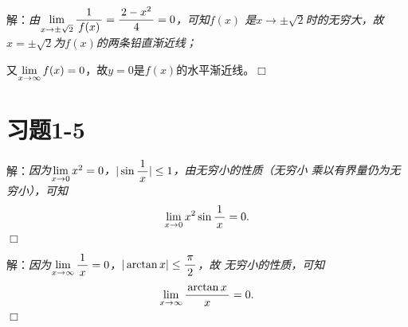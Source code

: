 \begin{frame}
	\linespread{1.5}
	\pause
	
	\bigskip
	
	解：\it 由$\lim\limits_{x\to{\pm\sqrt 2}}\displaystyle\frac{\,{1}\,}{\,{f(x)}\,}=\displaystyle\frac{\,{2-x^2}\,}{\,{4}\,}=0$，可知$f(x)$
	是$x\to\pm\sqrt2$时的无穷大，故$x=\pm\sqrt2$为$f(x)$的两条铅直渐近线；
	
	又$\lim\limits_{x\to{\infty}}f(x)=0$，故$y=0$是$f(x)$的水平渐近线。\hfill$\Box$
\end{frame}

\section{习题1-5}

\begin{frame}
	\linespread{1.5}
	\pause
	
	\bigskip
	
	解：\it 因为$\lim\limits_{x\to{0}}x^2=0$，$|\sin\displaystyle\frac{\,{1}\,}{\,{x}\,}|\leq1$，由无穷小的性质（无穷小
	乘以有界量仍为无穷小），可知
	$$\lim\limits_{x\to{0}}x^2\sin\displaystyle\frac{\,{1}\,}{\,{x}\,}=0.$$
	\hfill$\Box$
\end{frame}

\begin{frame}
	\linespread{1.5}
	\pause
	
	\bigskip
	
	解：\it 因为$\lim\limits_{x\to{\infty}}\displaystyle\frac{\,{1}\,}{\,{x}\,}=0$，$|\arctan x|\leq\displaystyle\frac{\,{\pi}\,}{\,{2}\,}$，故
	无穷小的性质，可知
	$$\lim\limits_{x\to{\infty}}\displaystyle\frac{\,{\arctan x}\,}{\,{x}\,}=0.$$
	\hfill$\Box$
\end{frame}